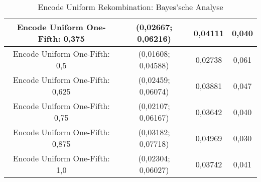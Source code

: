 \begin{table}[H]
\begin{tabular}{c | c | c | c}
		\hline
		Encode Uniform One-Fifth: 0,375 & (0,02667; 0,06216) & 0,04111 & 0,040\\
		\hline
		Encode Uniform One-Fifth: 0,5 & \color{Green}(0,01608; 0,04588)\color{black} & \color{Green}0,02738\color{black} & \color{Green}0,061\color{black}\\
		\hline
		Encode Uniform One-Fifth: 0,625 & (0,02459; 0,06074) & 0,03881 & 0,047\\
		\hline
		Encode Uniform One-Fifth: 0,75 & (0,02107; 0,06167) & 0,03642 & 0,040\\
		\hline
		Encode Uniform One-Fifth: 0,875 & \color{red}(0,03182; 0,07718)\color{black} &\color{red} 0,04969\color{black} & \color{red}0,030\color{black}\\
		\hline
		Encode Uniform One-Fifth: 1,0 & (0,02304; 0,06027) & 0,03742 & 0,041\\
	\end{tabular}
	\caption{Encode Uniform Rekombination: Bayes'sche Analyse}
	\label{table:encodeUniformBayesian}
\end{table} 
